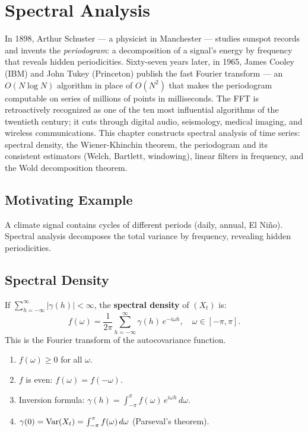 \chapter{Spectral Analysis}
\label{ch:spectrale}

In 1898, Arthur Schuster --- a physicist in Manchester --- studies sunspot records and invents the \emph{periodogram}: a decomposition of a signal's energy by frequency that reveals hidden periodicities. Sixty-seven years later, in 1965, James Cooley (IBM) and John Tukey (Princeton) publish the fast Fourier transform --- an $O(N \log N)$ algorithm in place of $O(N^2)$ that makes the periodogram computable on series of millions of points in milliseconds. The FFT is retroactively recognized as one of the ten most influential algorithms of the twentieth century; it cuts through digital audio, seismology, medical imaging, and wireless communications. This chapter constructs spectral analysis of time series: spectral density, the Wiener-Khinchin theorem, the periodogram and its consistent estimators (Welch, Bartlett, windowing), linear filters in frequency, and the Wold decomposition theorem.

\section{Motivating Example}
A climate signal contains cycles of different periods (daily, annual, El Ni\~no). Spectral analysis decomposes the total variance by frequency, revealing hidden periodicities.

\section{Spectral Density}

\begin{definition}
If $\sum_{h=-\infty}^{\infty}|\gamma(h)|<\infty$, the \textbf{spectral density} of $(X_t)$ is:
\[
f(\omega) = \frac{1}{2\pi}\sum_{h=-\infty}^{\infty}\gamma(h)\,e^{-i\omega h}, \quad \omega\in[-\pi,\pi].
\]
This is the Fourier transform of the autocovariance function.
\end{definition}

\begin{theorem}[Properties of $f$]
\begin{enumerate}
\item $f(\omega)\geq 0$ for all $\omega$.
\item $f$ is even: $f(\omega)=f(-\omega)$.
\item Inversion formula: $\gamma(h) = \int_{-\pi}^{\pi}f(\omega)\,e^{i\omega h}\,d\omega$.
\item $\gamma(0) = \operatorname{Var}(X_t) = \int_{-\pi}^{\pi}f(\omega)\,d\omega$ (Parseval's theorem).
\end{enumerate}
\end{theorem}

